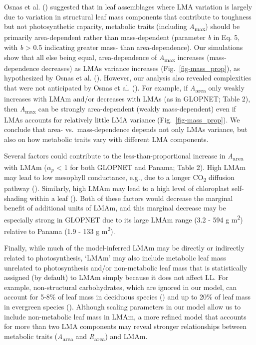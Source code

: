 \documentclass[
  12pt,
  letterpaper,
  DIV=11,
  numbers=noendperiod]{scrartcl}
\begin{document}
Osnas et al. () suggested that in leaf
assemblages where LMA variation is largely due to variation in
structural leaf mass components that contribute to toughness but not
photosynthetic capacity, metabolic traits (including
\emph{A}\textsubscript{max}) should be primarily area-dependent rather
than mass-dependent (parameter \emph{b} in Eq. 5, with \emph{b}
\textgreater{} 0.5 indicating greater mass- than area-dependence). Our
simulations show that all else being equal, area-dependence of
\emph{A}\textsubscript{max} increases (mass-dependence decreases) as
LMAs variance increases (Fig.~\ref{fig-mass_prop}), as hypothesized by
Osnas et al. (). However, our analysis
also revealed complexities that were not anticipated by Osnas et al.
(). For example, if
\emph{A}\textsubscript{area} only weakly increases with LMAm and/or
decreases with LMAs (as in GLOPNET; Table 2), then
\emph{A}\textsubscript{max} can be strongly area-dependent (weakly
mass-dependent) even if LMAs accounts for relatively little LMA variance
(Fig.~\ref{fig-mass_prop}). We conclude that area- vs.~mass-dependence
depends not only LMAs variance, but also on how metabolic traits vary
with different LMA components.

Several factors could contribute to the less-than-proportional increase
in \emph{A}\textsubscript{area} with LMAm (\(\alpha_p\) \textless{} 1
for both GLOPNET and Panama; Table 2). High LMAm may lead to low
mesophyll conductance, e.g., due to a longer CO\textsubscript{2}
diffusion pathway ().
Similarly, high LMAm may lead to a high level of chloroplast
self-shading within a leaf (). Both of these factors would decrease the marginal benefit
of additional units of LMAm, and this marginal decrease may be
especially strong in GLOPNET due to its large LMAm range (3.2 - 594 g
m\textsuperscript{2}) relative to Panama (1.9 - 133 g
m\textsuperscript{2}).

Finally, while much of the model-inferred LMAm may be directly or
indirectly related to photosynthesis, `LMAm' may also include metabolic
leaf mass unrelated to photosynthesis and/or non-metabolic leaf mass
that is statistically assigned (by default) to LMAm simply because it
does not affect LL. For example, non-structural carbohydrates, which are
ignored in our model, can account for 5-8\% of leaf mass in deciduous
species () and up to 20\% of
leaf mass in evergreen species
().
Although scaling parameters in our model allow us to include
non-metabolic leaf mass in LMAm, a more refined model that accounts for
more than two LMA components may reveal stronger relationships between
metabolic traits (\emph{A}\textsubscript{area} and
\emph{R}\textsubscript{area}) and LMAm.
\end{document}

